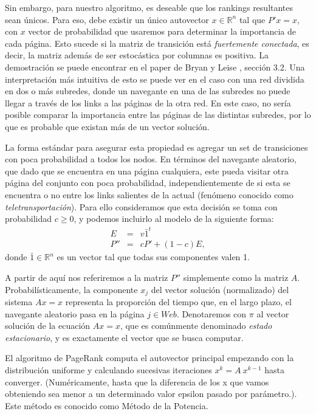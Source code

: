 \par Sin embargo, para nuestro algoritmo, es deseable que los rankings resultantes sean únicos. Para eso, debe existir un único autovector $x\in \mathbb{R}^n$ tal que $P'x = x$, con $x$ vector de probabilidad que usaremos para determinar la importancia de cada página. Esto sucede si la matriz de transición está \textit{fuertemente conectada}, es decir, la matriz además de ser estocástica por columnas es positiva. La demostración se puede encontrar en el paper de Bryan y Leise  \cite{Bryan2006}, sección 3.2. Una interpretación más intuitiva de esto se puede ver en el caso con una red dividida en dos o más subredes, donde un navegante en una de las subredes no puede llegar a través de los links a las páginas de la otra red. En este caso, no sería posible comparar la importancia entre las páginas de las distintas subredes, por lo que es probable que existan más de un vector solución.

\par La forma estándar para asegurar esta propiedad es agregar un set de transiciones con poca probabilidad a todos los nodos. En términos del navegante aleatorio, que dado que se encuentra en una página cualquiera, este pueda visitar otra página del conjunto con poca probabilidad, independientemente de si esta se encuentra o no entre los links salientes de la actual (fenómeno conocido como \textit{teletransportación}). Para ello consideramos que esta decisión se toma con probabilidad $c \geq 0$, y podemos incluirlo al modelo de la siguiente forma:
\begin{eqnarray*}
E & = & v \bar{1}^t \\
P'' & = & cP' + (1-c)E,
\end{eqnarray*}
\noindent donde $\bar{1} \in \mathbb{R}^n$ es un vector tal que todas sus componentes valen 1.

\par A partir de aquí nos referiremos a la matriz $P''$ simplemente como la matriz $A$. Probabil\'isticamente, la
componente $x_j$ del vector soluci\'on (normalizado) del sistema $Ax = x$ representa la proporci\'on del tiempo que,
en el largo plazo, el navegante aleatorio pasa en la p\'agina $j \in Web$. Denotaremos con $\pi$ al vector soluci\'on 
de la ecuaci\'on $A x = x$, que es com\'unmente denominado \emph{estado estacionario}, y es exactamente el vector que se busca computar.

\par El algoritmo de PageRank computa el autovector principal empezando con la distribución uniforme y calculando sucesivas iteraciones $x^k = A\ x^{k-1}$ hasta converger. (Numéricamente, hasta que la diferencia de los x que vamos obteniendo sea menor a un determinado valor epsilon pasado por parámetro.). Este método es conocido como Método de la Potencia.


